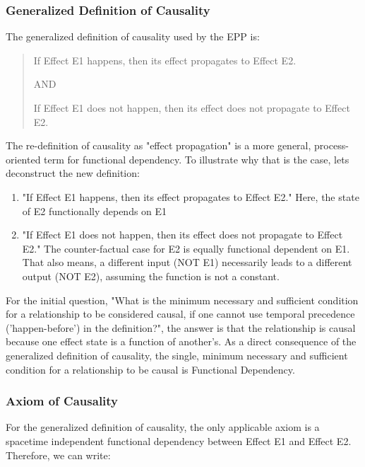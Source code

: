 \subsubsection{Generalized Definition of Causality}

The generalized definition of causality used by the EPP is:

\begin{quote}
	If Effect E1 happens, then its effect propagates to Effect E2.

    AND
    
	If Effect E1 does not happen, then its effect does not propagate to Effect E2.
\end{quote}


The re-definition of causality as "effect propagation" is a more general, process-oriented term for functional dependency.
To illustrate why that is the case, lets deconstruct the new definition:


\begin{enumerate}
    \item "If Effect E1 happens, then its effect propagates to Effect E2." Here, the state of E2 functionally depends on E1
    \item "If Effect E1 does not happen, then its effect does not propagate to Effect E2." The counter-factual case for E2 is equally functional dependent on E1. That also means, a different input (NOT E1) necessarily leads to a different output (NOT E2), assuming the function is not a constant.
\end{enumerate}


For the initial question, "What is the minimum necessary and sufficient condition for a relationship to be considered causal, 
	if one cannot use temporal precedence ('happen-before') in the definition?", the answer is that the relationship is causal because one effect state is a function of another's. As a direct consequence of the generalized definition of causality, the single, minimum necessary and sufficient condition for a relationship to be causal is Functional Dependency. 

\subsubsection{Axiom of Causality}

 For the generalized definition of causality, the only applicable axiom is a spacetime independent functional dependency between Effect E1 and Effect E2. Therefore, we can write:


